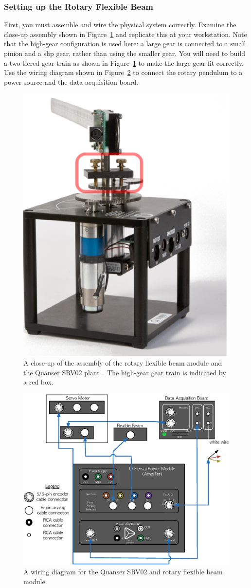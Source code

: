 \documentclass[12pt]{report}
\begin{document}
\subsubsection{Setting up the Rotary Flexible Beam}\label{sub subsection:lab1_setup}
First, you must assemble and wire the physical system correctly. Examine the close-up assembly shown in Figure~\ref{fig:lab1_assembly} and replicate this at your workstation. Note that the high-gear configuration is used here: a large gear is connected to a small pinion and a slip gear, rather than using the smaller gear. You will need to build a two-tiered gear train as shown in Figure~\ref{fig:lab1_assembly} to make the large gear fit correctly. Use the wiring diagram shown in Figure~\ref{fig:lab1_wiring} to connect the rotary pendulum to a power source and the data acquisition board.
\begin{figure}[htb!]
    \centering
    \includegraphics[width=.3\linewidth]{eps/lab_1/assembly.eps}
    \caption{A close-up of the assembly of the rotary flexible beam module and the Quanser SRV02 plant~\cite{Q-Flex-Beam}. The high-gear gear train is indicated by a red box.}
    \label{fig:lab1_assembly}
\end{figure}
\begin{figure}[htb!]
    \centering
    \includegraphics[width=.8\linewidth]{eps/lab_1/wiring.eps}
    \caption{A wiring diagram for the Quanser SRV02 and rotary flexible beam module.}
    \label{fig:lab1_wiring}
\end{figure}
\newpage
\end{document}
